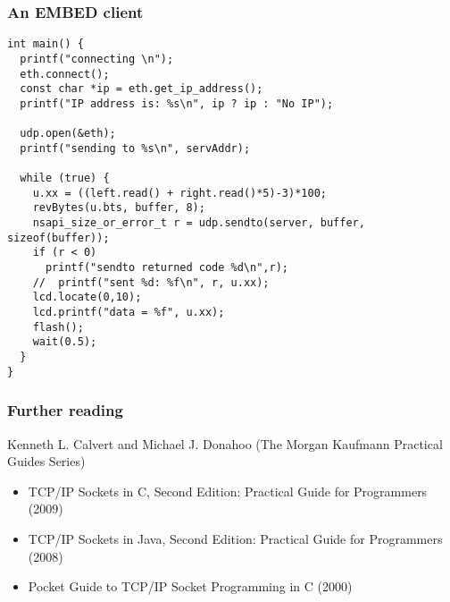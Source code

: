 \documentclass[10pt, hyperref={pdfpagelabels=false}]{beamer}
\begin{document}
\begin{frame} [fragile]
\frametitle{An EMBED client}
\footnotesize \color{brown}
\begin{verbatim}
int main() {
  printf("connecting \n");
  eth.connect();
  const char *ip = eth.get_ip_address();
  printf("IP address is: %s\n", ip ? ip : "No IP");

  udp.open(&eth);
  printf("sending to %s\n", servAddr);

  while (true) {
    u.xx = ((left.read() + right.read()*5)-3)*100;
    revBytes(u.bts, buffer, 8);
    nsapi_size_or_error_t r = udp.sendto(server, buffer, sizeof(buffer));
    if (r < 0)
      printf("sendto returned code %d\n",r);
    //  printf("sent %d: %f\n", r, u.xx);
    lcd.locate(0,10);
    lcd.printf("data = %f", u.xx);
    flash();
    wait(0.5);
  }
}
\end{verbatim}
\end{frame}

\begin{frame}
\frametitle{Further reading}
Kenneth L. Calvert and Michael J. Donahoo (The Morgan Kaufmann Practical Guides Series)
\begin{itemize}
\item TCP/IP Sockets in C, Second Edition: Practical Guide for Programmers  (2009)
\item TCP/IP Sockets in Java, Second Edition: Practical Guide for Programmers (2008)
\item Pocket Guide to TCP/IP Socket Programming in C (2000)
\end{itemize}


\end{frame}
\end{document}
